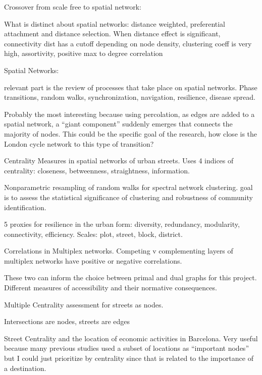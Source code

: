 \documentclass[11pt]{article} %
\begin{document}
Crossover from scale free to spatial network:

What is distinct about spatial networks: distance weighted, preferential attachment and distance selection. When distance effect is significant, connectivity dist has a cutoff depending on node density, clustering coeff is very high, assortivity, positive max to degree correlation
\cite{barthelemy2003crossover}

Spatial Networks:

relevant part is the review of processes that take place on spatial networks. 
Phase transitions, random walks, synchronization, navigation, resilience, disease spread. 
\cite{barthelemy2011spatial}

Probably the most interesting because using percolation, as edges are added to a spatial network, a ``giant component'' suddenly emerges that connects the majority of nodes. This could be the specific goal of the research, how close is the London cycle network to this type of transition? 
\cite{barthelemy2018transitions}

Centrality Measures in spatial networks of urban streets. Uses 4 indices of centrality: closeness, betweenness, straightness, information. 
\cite{crucitti2006centrality}

Nonparametric resampling of random walks for spectral network clustering.
goal is to assess the statistical significance of clustering and robustness of community identification. 
\cite{fallani2014nonparametric}

5 proxies for resilience in the urban form: diversity, redundancy, modularity, connectivity, efficiency. 
Scales: plot, street, block, district.
\cite{feliciotti2016design}


Correlations in Multiplex networks. Competing v complementing layers of multiplex networks have positive or negative correlations. \cite{nicosia2015measuring}

These two can inform the choice between primal and dual graphs for this project. Different measures of accessibility and their normative consequences. \cite{paez2012measuring}

Multiple Centrality assessment for streets as nodes. 
\cite{porta2006primal}

Intersections are nodes, streets are edges
\cite{porta2006dual}

Street Centrality and the location of economic activities in Barcelona. Very useful because many previous studies used a subset of locations as ``important nodes'' but I could just prioritize by centrality since that is related to the importance of a destination. 
\cite{porta2012street}
\end{document}
